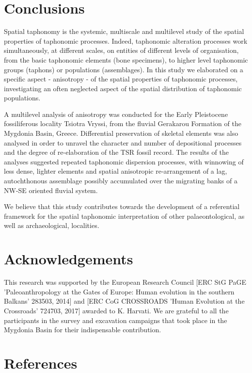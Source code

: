 \documentclass[review,times,authoryear]{elsarticle} %
\begin{document}
\section{Conclusions}

Spatial taphonomy is the systemic, multiscale and multilevel study of the spatial properties of taphonomic processes. Indeed, taphonomic alteration processes work simultaneously, at different scales, on entities of different levels of organisation, from the basic taphonomic elements (bone specimens), to higher level taphonomic groups (taphons) or populations (assemblages). In this study we elaborated on a specific aspect - anisotropy - of the spatial properties of taphonomic processes, investigating an often neglected aspect of the spatial distribution of taphonomic populations.

A multilevel analysis of anisotropy was conducted for the Early Pleistocene fossiliferous locality Tsiotra Vryssi, from the fluvial Gerakarou Formation of the Mygdonia Basin, Greece. Differential preservation of skeletal elements was also analysed in order to unravel the character and number of depositional processes and the degree of re-elaboration of the TSR fossil record. The results of the analyses suggested repeated taphonomic dispersion processes, with winnowing of less dense, lighter elements and spatial anisotropic re-arrangement of a lag, autochthonous assemblage possibly accumulated over the migrating banks of a NW-SE oriented fluvial system.

We believe that this study contributes towards the development of a referential framework for the spatial taphonomic interpretation of other palaeontological, as well as archaeological, localities.

\section*{Acknowledgements}

This research was supported by the European Research Council [ERC StG PaGE 'Paleoanthropology at the Gates of Europe: Human evolution in the southern Balkans' 283503, 2014] and [ERC CoG CROSSROADS 'Human Evolution at the Crossroads' 724703, 2017] awarded to K. Harvati. We are grateful to all the participants in the survey and excavation campaigns that took place in the Mygdonia Basin for their indispensable contribution. %
 
\section*{References}



\end{document}
